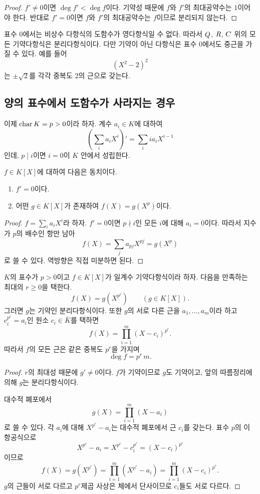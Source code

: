 \begin{proof}
$f'\ne0$이면 $\deg f'<\deg f$이다. 기약성 때문에 $f$와 $f'$의 최대공약수는 $1$이어야 한다. 반대로 $f'=0$이면 $f$와 $f'$의 최대공약수는 $f$이므로 분리되지 않는다.
\end{proof}

\begin{example}
표수 $0$에서는 비상수 다항식의 도함수가 영다항식일 수 없다. 따라서 $Q$, $R$, $C$ 위의 모든 기약다항식은 분리다항식이다. 다만 기약이 아닌 다항식은 표수 $0$에서도 중근을 가질 수 있다. 예를 들어
\[
  (X^2-2)^2
\]
는 $\pm\sqrt2$를 각각 중복도 $2$의 근으로 갖는다.
\end{example}

\subsection{양의 표수에서 도함수가 사라지는 경우}

이제 $\operatorname{char} K=p>0$이라 하자. 계수 $a_i\in K$에 대하여
\[
  \left(\sum_i a_iX^i\right)'=\sum_i i a_iX^{i-1}
\]
인데, $p\mid i$이면 $i=0$이 $K$ 안에서 성립한다.

\begin{lemma}
$f\in K[X]$에 대하여 다음은 동치이다.
\begin{enumerate}[label=(\roman*)]
  \item $f'=0$이다.
  \item 어떤 $g\in K[X]$가 존재하여 $f(X)=g(X^p)$이다.
\end{enumerate}
\end{lemma}

\begin{proof}
$f=\sum_i a_iX^i$라 하자. $f'=0$이면 $p\nmid i$인 모든 $i$에 대해 $a_i=0$이다. 따라서 지수가 $p$의 배수인 항만 남아
\[
  f(X)=\sum_j a_{pj}X^{pj}=g(X^p)
\]
로 쓸 수 있다. 역방향은 직접 미분하면 된다.
\end{proof}

\begin{theorem}
$K$의 표수가 $p>0$이고 $f\in K[X]$가 일계수 기약다항식이라 하자. 다음을 만족하는 최대의 $r\ge0$을 택한다.
\[
  f(X)=g\!\left(X^{p^r}\right)
  \qquad(g\in K[X]).
\]
그러면 $g$는 기약인 분리다항식이다. 또한 $g$의 서로 다른 근을 $a_1,\dots,a_m$이라 하고 $c_i^{p^r}=a_i$인 원소 $c_i\in\overline K$를 택하면
\[
  f(X)=\prod_{i=1}^m (X-c_i)^{p^r}.
\]
따라서 $f$의 모든 근은 같은 중복도 $p^r$을 가지며
\[
  \deg f=p^r\,m.
\]
\end{theorem}

\begin{proof}
$r$의 최대성 때문에 $g'\ne0$이다. $f$가 기약이므로 $g$도 기약이고, 앞의 따름정리에 의해 $g$는 분리다항식이다.

대수적 폐포에서
\[
  g(X)=\prod_{i=1}^m(X-a_i)
\]
로 쓸 수 있다. 각 $a_i$에 대해 $X^{p^r}-a_i$는 대수적 폐포에서 근 $c_i$를 갖는다. 표수 $p$의 이항공식으로
\[
  X^{p^r}-a_i=X^{p^r}-c_i^{p^r}=(X-c_i)^{p^r}
\]
이므로
\[
  f(X)=g(X^{p^r})
  =\prod_{i=1}^m\left(X^{p^r}-a_i\right)
  =\prod_{i=1}^m(X-c_i)^{p^r}.
\]
$g$의 근들이 서로 다르고 $p^r$제곱 사상은 체에서 단사이므로 $c_i$들도 서로 다르다.
\end{proof}

